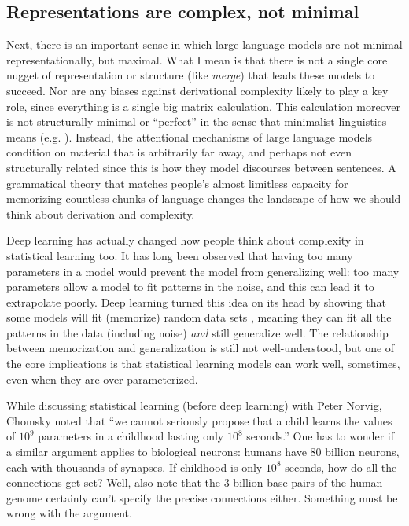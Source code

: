 \documentclass[output=paper,colorlinks,citecolor=brown
]{langscibook}
\begin{document}
\subsection{Representations are complex, not minimal}

Next, there is an important sense in which large language models are not minimal representationally, but maximal. What I mean is that there is not a single core nugget of representation or structure (like \textit{merge}) that leads these models to succeed. Nor are any biases against derivational complexity likely to play a key role, since everything is a single big matrix calculation. This calculation moreover is not structurally minimal or ``perfect'' in the sense that minimalist linguistics means (e.g. \citealt{lasnik2002minimalist}). Instead, the attentional mechanisms of large language models condition on material that is arbitrarily far away, and perhaps not even structurally related since this is how they model discourses between sentences. A grammatical theory that matches people's almost limitless capacity for memorizing countless chunks of language changes the landscape of how we should think about derivation and complexity. 

Deep learning has actually changed how people think about complexity in statistical learning too. It has long been observed that having too many parameters in a model would prevent the model from generalizing well: too many parameters allow a model to fit patterns in the noise, and this can lead it to extrapolate poorly. Deep learning turned this idea on its head by showing that some models will fit (memorize) random data sets \citep{zhang2021understanding}, meaning they can fit all the patterns in the data (including noise) \textit{and} still generalize well. The relationship between memorization and generalization is still not well-understood, but one of the core implications is that statistical learning models can work well, sometimes, even when they are over-parameterized. 

While discussing statistical learning (before deep learning) with Peter Norvig, Chomsky noted that ``we cannot seriously propose that a child learns the values of $10^9$ parameters in a childhood lasting only $10^8$ seconds.'' One has to wonder if a similar argument applies to biological neurons: humans have $80$ billion neurons, each with thousands of synapses. If childhood is only $10^8$ seconds, how do all the connections get set? Well, also note that the $3$ billion base pairs of the human genome certainly can't specify the precise connections either. Something must be wrong with the argument. 
\end{document}
